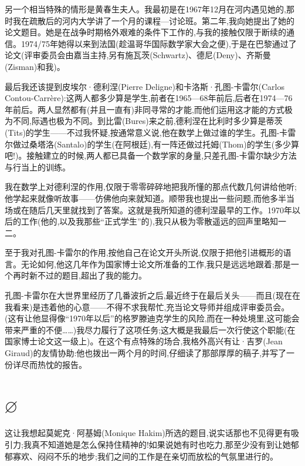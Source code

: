 另一个相当特殊的情形是黄春生夫人。我最初是在1967年12月在河内遇见她的,那时我在疏散后的河内大学讲了一个月的课程—讨论班。第二年,我向她提出了她的论文题目。她是在战争时期格外艰难的条件下工作的,与我的接触仅限于断续的通信。1974/75年她得以来到法国(趁温哥华国际数学家大会之便),于是在巴黎通过了论文(评审委员会由嘉当主持,另有施瓦茨(Schwartz)、德尼(Deny)、齐斯曼(Zisman)和我)。

最后我还该提到皮埃尔·德利涅(Pierre Deligne)和卡洛斯·孔图-卡雷尔(Carlos Contou-Carrère):这两人都多少算是学生,前者在1965—68年前后,后者在1974—76年前后。两人显然都有(并且一直有)非同寻常的才能,而他们运用这才能的方式极为不同,际遇也极为不同。到比雷(Bures)来之前,德利涅在比利时多少算是蒂茨(Tits)的学生——不过我怀疑,按通常意义说,他在数学上做过谁的学生。孔图-卡雷尔做过桑塔洛(Santalo)的学生(在阿根廷),有一阵还做过托姆(Thom)的学生(多少算吧!)。接触建立的时候,两人都已具备一个数学家的身量,只差孔图-卡雷尔缺少方法与行当上的训练。

我在数学上对德利涅的作用,仅限于零零碎碎地把我所懂的那点代数几何讲给他听;他学起来就像听故事——仿佛他向来就知道。顺带我也提出一些问题,而他多半当场或在随后几天里就找到了答案。这就是我所知道的德利涅最早的工作。1970年以后的工作(他的,以及我那些“正式学生”的),我只从极为零散遥远的回声里略知一二。

至于我对孔图-卡雷尔的作用,按他自己在论文开头所说,仅限于把他引进概形的语言。无论如何,他这几年作为国家博士论文所准备的工作,我只是远远地跟着;那是一个再时新不过的题目,超出了我的能力。

孔图-卡雷尔在大世界里经历了几番波折之后,最近终于在最后关头——而且(现在在我看来)是违着他的心意——不得不求我帮忙,充当论文导师并组成评审委员会。(这有让他显得像“1970年以后”的格罗滕迪克学生的风险,而在一种处境里,这可能会带来严重的不便……)我尽力履行了这项任务;这大概是我最后一次行使这个职能(在国家博士论文这一级上)。在这个有点特殊的场合,我格外高兴有让·吉罗(Jean Giraud)的友情协助:他也拨出一两个月的时间,仔细读了那部厚厚的稿子,并写了一份详尽而热忱的报告。

\section{$\varnothing$}

这让我想起莫妮克·阿基姆(Monique Hakim)所选的题目,说实话那也不见得更有吸引力;我真不知道她是怎么保持住精神的!如果说她有时也吃力,那至少没有到让她郁郁寡欢、闷闷不乐的地步;我们之间的工作是在亲切而放松的气氛里进行的。

